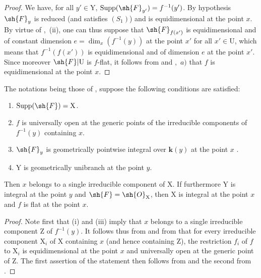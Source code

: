 \begin{proof}
\label{IV.15.3.2-proof}
We have, for all $y'\in\mathrm{Y}$, $\operatorname{Supp}(\sh{F}_{y'})=f^{-1}(y')$.
By hypothesis $\sh{F}_y$ is reduced (and satisfies $(S_1)$) and is equidimensional at the point $x$.
By virtue of ,~(ii), one can thus suppose that $\sh{F}_{f(x')}$ is equidimensional and of constant dimension $e=\dim_x(f^{-1}(y))$ at the point $x'$ for all $x'\in\mathrm{U}$, which means that $f^{-1}(f(x'))$ is equidimensional and of dimension $e$ at the point $x'$.
Since moreover $\sh{F}|\mathrm{U}$ is $f$-flat, it follows from  and ,~$a)$ that $f$ is equidimensional at the point $x$.
\end{proof}

\begin{corollary}[15.3.3]
\label{IV.15.3.3}
The notations being those of , suppose the following conditions are satisfied:
\begin{enumerate}[label=(\roman*)]
  \item $\operatorname{Supp}(\sh{F})=\mathrm{X}$.
  \item $f$ is universally open at the generic points of the irreducible components of $f^{-1}(y)$ containing $x$.
  \item $\sh{F}_y$ is geometrically pointwise integral over $\mathbf{k}(y)$ at the point $x$ .
  \item $\mathrm{Y}$ is geometrically unibranch at the point $y$.
\end{enumerate}
Then $x$ belongs to a single irreducible component of $\mathrm{X}$.
If furthermore $\mathrm{Y}$ is integral at the point $y$ and $\sh{F}=\sh{O}_\mathrm{X}$, then $\mathrm{X}$ is integral at the point $x$ and $f$ is flat at the point $x$.
\end{corollary}

\begin{proof}
\label{IV.15.3.3-proof}
Note first that (i) and (iii) imply that $x$ belongs to a single irreducible component $\mathrm{Z}$ of $f^{-1}(y)$.
It follows thus from  and from  that for every irreducible component $\mathrm{X}_i$ of $\mathrm{X}$ containing $x$ (and hence containing $\mathrm{Z}$), the restriction $f_i$ of $f$ to $\mathrm{X}_i$ is equidimensional at the point $x$ and universally open at the generic point of $\mathrm{Z}$.
The first assertion of the statement then follows from  and the second from .
\end{proof}

